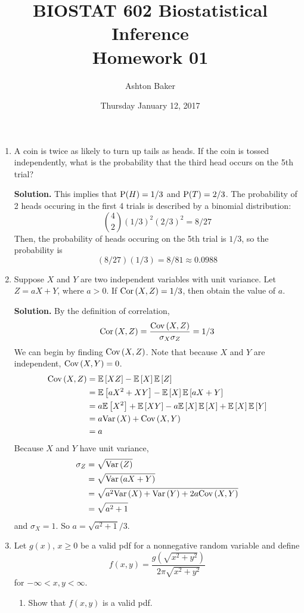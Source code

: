 \documentclass[titlepage]{article}
\begin{document}
\title{BIOSTAT 602 Biostatistical Inference\\Homework 01}
\author{Ashton Baker}
\date{Thursday January 12, 2017}
\maketitle
\begin{enumerate}
\item A coin is twice as likely to turn up tails as heads. If the coin is tossed independently, what is the probability that the third head occurs on the 5th trial?

\textbf{Solution.} This implies that $\P(H) = 1/3$ and $\P(T) = 2/3$. The probability of 2 heads occuring in the first 4 trials is described by a binomial distribution:
\[\binom{4}{2}(1/3)^2(2/3)^2 = 8/27\]
Then, the probability of heads occuring on the 5th trial is $1/3$, so the probability is
\[(8/27)(1/3) = 8/81 \approx 0.0988\]

\item Suppose $X$ and $Y$ are two independent variables with unit variance. Let $Z = aX + Y$, where $a > 0$. If $\cor{X, Z} = 1/3$, then obtain the value of $a$.

\textbf{Solution.} By the definition of correlation,
\[\cor{X, Z} = \frac{\cov{X, Z}}{\sigma_X \sigma_Z} = 1/3\]
We can begin by finding $\cov{X, Z}$. Note that because $X$ and $Y$ are independent, $\cov{X, Y} = 0$.
\[\begin{aligned}
\cov{X, Z} &= \ev{XZ} - \ev{X}\ev{Z} \\
           &= \ev{aX^2 + XY} - \ev{X}\ev{aX + Y} \\
           &= a\ev{X^2} + \ev{XY} - a\ev{X}\ev{X} + \ev{X}\ev{Y} \\
           &= a \var{X} + \cov{X, Y} \\
           &= a
\end{aligned}\]
Because $X$ and $Y$ have unit variance,
\[\begin{aligned}
\sigma_Z &= \sqrt{\var{Z}} \\
         &= \sqrt{\var{aX + Y}} \\
         &= \sqrt{a^2 \var{X} + \var{Y} + 2a\cov{X, Y}} \\
         &= \sqrt{a^2 + 1}
\end{aligned}\]
and $\sigma_X = 1$. So $a = \sqrt{a^2 + 1} / 3$.

\item Let $g(x)$, $x \geq 0$ be a valid pdf for a nonnegative random variable and define
\[ f(x, y) = \frac{ g(\sqrt{x^2 + y^2}) }{ 2\pi \sqrt{x^2 + y^2} }\]
for $-\infty < x, y < \infty$.
  \begin{enumerate}
  \item Show that $f(x, y)$ is a valid pdf.


\end{enumerate}
\end{enumerate}
\end{document}
